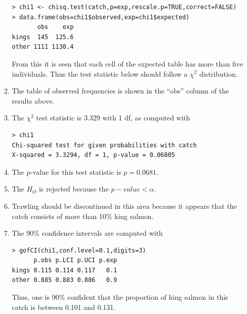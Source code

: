 \documentclass[10pt,openany]{book}\usepackage[]{graphicx}\usepackage[]{color}
\makeatletter
\newenvironment{kframe}{%
 \def\at@end@of@kframe{}%
 \ifinner\ifhmode%
  \def\at@end@of@kframe{\end{minipage}}%
  \begin{minipage}{\columnwidth}%
 \fi\fi%
 \def\FrameCommand##1{\hskip\@totalleftmargin \hskip-\fboxsep
 \colorbox{shadecolor}{##1}\hskip-\fboxsep
     \hskip-\linewidth \hskip-\@totalleftmargin \hskip\columnwidth}%
 \MakeFramed {\advance\hsize-\width
   \@totalleftmargin\z@ \linewidth\hsize
   \@setminipage}}%
 {\par\unskip\endMakeFramed%
 \at@end@of@kframe}
\newenvironment{knitrout}{}{} %
\makeatother
\begin{document}
\begin{itemize}
\begin{enumerate}
\begin{knitrout}
\color{fgcolor}\begin{kframe}
\begin{verbatim}
> chi1 <- chisq.test(catch,p=exp,rescale.p=TRUE,correct=FALSE)
> data.frame(obs=chi1$observed,exp=chi1$expected)
       obs    exp
kings  145  125.6
other 1111 1130.4
\end{verbatim}
\end{kframe}
\end{knitrout}
From this it is seen that each cell of the expected table has more than five individuals.  Thus the test statistic below should follow a $\chi^{2}$ distribution.
      \item The table of observed frequencies is shown in the ``obs'' column of the results above.
      \item The $\chi^{2}$ test statistic is 3.329 with 1 df, as computed with
\begin{knitrout}
\color{fgcolor}\begin{kframe}
\begin{verbatim}
> chi1
Chi-squared test for given probabilities with catch 
X-squared = 3.3294, df = 1, p-value = 0.06805
\end{verbatim}
\end{kframe}
\end{knitrout}
      \item The p-value for this test statistic is $p=0.0681$.
      \item The $H_{O}$ is rejected because the $p-value<\alpha$.
      \item Trawling should be discontinued in this area because it appears that the catch consists of more than 10\% king salmon.
      \item The 90\% confidence intervals are computed with
\begin{knitrout}
\color{fgcolor}\begin{kframe}
\begin{verbatim}
> gofCI(chi1,conf.level=0.1,digits=3)
      p.obs p.LCI p.UCI p.exp
kings 0.115 0.114 0.117   0.1
other 0.885 0.883 0.886   0.9
\end{verbatim}
\end{kframe}
\end{knitrout}
Thus, one is 90\% confident that the proportion of king salmon in this catch is between 0.101 and 0.131.
    \end{enumerate}



\end{itemize}
\end{document}
